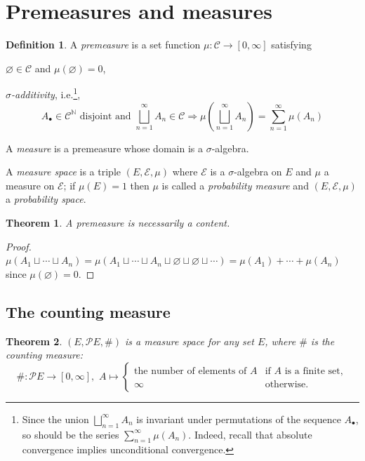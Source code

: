 \documentclass[11pt, a4paper, openany]{book}
\newtheorem{thm}{Theorem}\newtheorem{lem}{Lemma}\newtheorem{crl}{Corollary}
\theoremstyle{definition}
\newtheorem{define}{Definition}\newtheorem{exam}{Example}\newtheorem{remark}{Remark}
\newenvironment{tight_enumerate}{\begin{enumerate}\itemsep -0.2em}{\end{enumerate}}
\begin{document}
\section{Premeasures and measures}
    \begin{define}
        A \textit{premeasure} is a set function $\mu:\mathscr{C}\rightarrow [0,\infty]$ satisfying
        \begin{tight_enumerate}
            \item $\varnothing\in\mathscr{C}$ and $\mu(\varnothing)=0$,
            \item \textit{$\sigma$-additivity}, i.e.\footnote{Since the union $\bigsqcup_{n=1}^\infty A_n$ is invariant under permutations of the sequence $A_\bullet$, so should be the series $\sum_{n=1}^\infty\mu(A_n)$. Indeed, recall that absolute convergence implies unconditional convergence.},
            \[
                A_\bullet\in\mathscr{C}^\mathbb{N}\text{ disjoint and }\bigsqcup_{n=1}^\infty A_n\in\mathscr{C}\Longrightarrow \mu\left(\bigsqcup_{n=1}^\infty A_n\right)=\sum_{n=1}^\infty\mu(A_n)
            \]
        \end{tight_enumerate}
        
        A \textit{measure} is a premeasure whose domain is a $\sigma$-algebra. 
        
        A \textit{measure space} is a triple $(E,\mathscr{E},\mu)$ where $\mathscr{E}$ is a $\sigma$-algebra on $E$ and $\mu$ a measure on $\mathscr{E}$; if $\mu(E)=1$ then $\mu$ is called a \textit{probability measure} and $(E,\mathscr{E},\mu)$ a \textit{probability space}.
    \end{define}
    \begin{thm}
        A premeasure is necessarily a content.
    \end{thm}
    \begin{proof}
        $\mu(A_1\sqcup \cdots\sqcup A_n)=\mu(A_1\sqcup\cdots\sqcup A_n\sqcup\varnothing\sqcup\varnothing\sqcup\cdots)=\mu(A_1)+\cdots+\mu(A_n)$ since $\mu(\varnothing)=0$.
    \end{proof}
\subsection{The counting measure}
    \begin{thm}
        $(E,\mathscr{P}E,\#)$ is a measure space for any set $E$, where $\#$ is the {counting measure}:
        \[
            \#:\mathscr{P}E\rightarrow [0,\infty],\,\,A\mapsto \begin{cases}
                \text{the number of elements of }A & \text{if $A$ is a finite set},\\
                \infty &\text{otherwise}.
            \end{cases}
        \]
    \end{thm}
\end{document}

